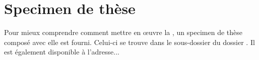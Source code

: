 \chapter{Specimen de thèse}\label{cha:specimen}

Pour mieux comprendre comment mettre en œuvre la \yatcl, un specimen de thèse
composé avec elle est fourni. Celui-ci se trouve dans le sous-dossier
 du dossier . Il est également
disponible à l'adresse...


%
\iffalse
\fi

